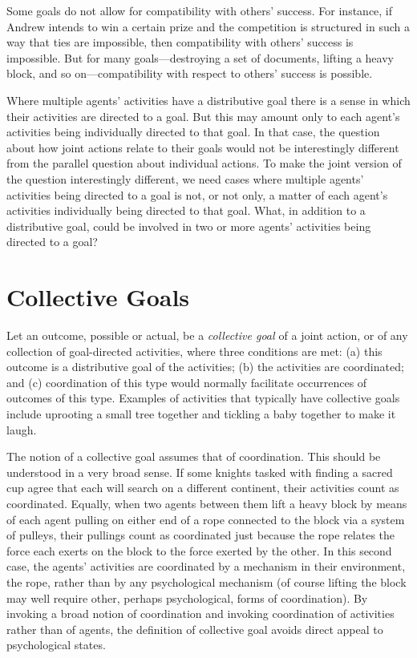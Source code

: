 \documentclass[12pt,a4paper]{extarticle}
\begin{document}
Some goals do not allow for compatibility with others'  success.  For instance, if Andrew intends to win a certain prize and the competition is structured in such a way that ties are impossible, then compatibility with others' success is impossible.  
But for many goals---destroying a set of documents, lifting a heavy block, and so on---compatibility with respect to others' success is possible.

Where multiple agents' activities have a distributive goal there is a sense in which their activities are directed to a goal.  But this may amount only to each agent's activities being individually directed to that goal.  In that case, the question about how joint actions relate to their goals would not be interestingly different from the parallel question about individual actions.
To make the joint version of the question interestingly different, we need cases where multiple agents' activities being directed to a goal is not, or not only, a matter of each agent's activities individually being directed to that goal.
What, in addition to a distributive goal, could be involved in two or more agents' activities being directed to a goal?



\section{Collective Goals}
\label{section_collective}

Let an outcome, possible or actual, be a \emph{collective goal \label{df_collective_goal}} of a joint action, or of any collection of goal-directed activities, where three conditions are met: 
	(a) this outcome is a distributive goal of the activities; 
	(b) the activities are coordinated; and 
	(c)  coordination of this type would normally  facilitate occurrences of outcomes of this type.  
Examples of activities that typically have collective goals include uprooting a small tree together and tickling a baby together to make it laugh.

The notion of a collective goal assumes that of coordination.  This should be understood in a very broad sense.  If some knights tasked with finding a sacred cup agree that each will search on a different continent, their activities count as coordinated.  Equally, when two agents between them lift a heavy block by means of each agent pulling on either end of a rope connected to the block via a system of pulleys, their pullings count as coordinated just because the rope relates the force each exerts on the block to the force exerted by the other.  In this second case, the agents' activities are coordinated by a mechanism in their environment, the rope, rather than by any psychological mechanism (of course lifting the block may well require other, perhaps psychological, forms of coordination).  
By invoking a broad notion of coordination 
and invoking coordination of activities rather than of agents,
the definition of collective goal avoids direct appeal to psychological states.
\end{document}
